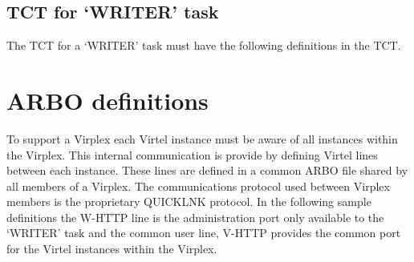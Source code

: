 \documentclass[letterpaper,10pt,english]{sphinxmanual}
\begin{document}
\subsection{TCT for ‘WRITER’ task}
\label{\detokenize{connectivity_guide:tct-for-writer-task}}
The TCT for a ‘WRITER’ task must have the following definitions in the TCT.

\begin{sphinxVerbatim}[commandchars=\\\{\}]
                               
                              
  
                   
  
                       
                       
\end{sphinxVerbatim}

\ignorespaces 

\section{ARBO definitions}
\label{\detokenize{connectivity_guide:arbo-definitions}}\label{\detokenize{connectivity_guide:index-179}}
To support a Virplex each Virtel instance must be aware of all instances within the Virplex. This internal communication is provide by defining Virtel lines between each instance. These lines are defined in a common ARBO file shared by all members of a Virplex. The communications protocol used between Virplex members is the proprietary QUICKLNK protocol. In the following sample definitions the W-HTTP line is the administration port only available to the ‘WRITER’ task and the common user line, V-HTTP provides the common port for the Virtel instances within the Virplex.
\end{document}
